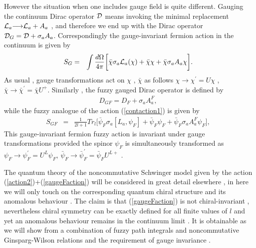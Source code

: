 \documentclass[a4paper,10pt]{article}
\begin{document}
However the situation when one includes gauge field is quite
different. Gauging the continuum Dirac operator ${\cal D}$ means
invoking the minimal replacement ${\cal
L}_a{\longrightarrow}{\cal L}_a+{A}_a$ , and therefore we end up
with the Dirac operator $ {\cal D}_{G}={\cal
D}+{{\sigma}}_a{A}_a$. Correspondingly the gauge-invariant
fermion action in the continuum is given by
\begin{eqnarray}
S_{G}&=&\int
\frac{d{\Omega}}{4{\pi}}\bigg[\bar{\chi}{\sigma}_a{\cal
L}_a({\chi})+\bar{\chi}{\chi}+\bar{\chi}{\sigma}_aA_a{\chi}\bigg].\label{contaction1}
\end{eqnarray}
As usual , gauge transformations act on  ${\chi}$ , $\bar{\chi}$
as follows ${\chi}{\longrightarrow}{\chi}^{'}=U{\chi}$ ,
$\bar{\chi}{\longrightarrow}\bar{\chi}^{'}=\bar{\chi}U^{+}$.
Similarly , the fuzzy gauged Dirac operator is defined by
\begin{eqnarray}
{D}_{GF}={D}_{F}+{\sigma}_aA_a^F,\label{GFsummary}
\end{eqnarray}
while the fuzzy analogue of the action (\ref{contaction1}) is
given by
\begin{eqnarray}
S_{GF}&=&\frac{1}{2l+1}Tr_{l}\bigg[\bar{{\psi}}_F{\sigma}_{a}[L_a,{\psi}_F]+\bar{\psi}_F{\psi}_F+\bar{{\psi}}_F{\sigma}_a{A}_a^F{{\psi}}_F\bigg],\label{gaugeFaction}
\end{eqnarray}
This gauge-invariant fermion fuzzy action is invariant under
gauge transformations provided the spinor ${\psi}_F$ is
simultaneously transformed as
${\psi}_F{\longrightarrow}{\psi}^{'}_{F}=U^L{\psi}_{F}$,
$\bar{\psi}_F{\longrightarrow}
\bar{\psi}^{'}_{F}=\bar{\psi}_{F}U^{L+}$ .


The quantum theory of the noncommutative Schwinger model given by
the action (\ref{action2})+(\ref{gaugeFaction}) will be
considered in great detail elsewhere \cite{badis} , in here we
will only touch on the corresponding quantum chiral structure and
its anomalous behaviour . The claim is that (\ref{gaugeFaction})
is not chiral-invariant , nevertheless chiral symmetry can be
exactly defined for all finite values of $l$ and yet an anomalous
behaviour remains in the continuum limit . It is obtainable as we
will show from a combination of fuzzy path integrals and
noncommutative Ginsparg-Wilson relations and the requirement of
gauge invariance .
\end{document}
